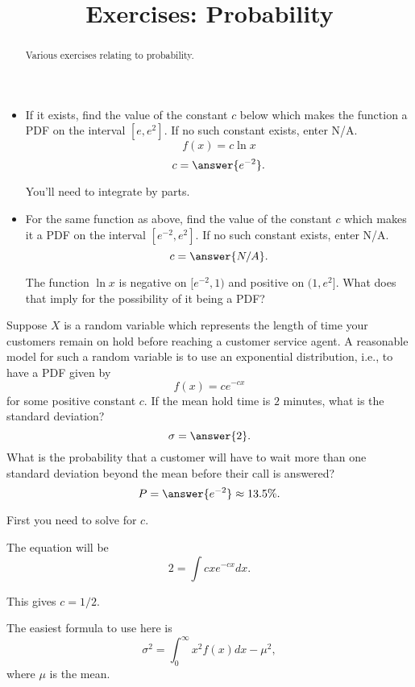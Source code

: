 \documentclass{ximera}
\title{Exercises: Probability}
\begin{document}
\begin{abstract}
Various exercises relating to probability.
\end{abstract}
\maketitle

\begin{exercise}
\begin{itemize}
\item If it exists, find the value of the constant $c$ below which makes the function a PDF on the interval $[e,e^2]$. If no such constant exists, enter N/A.
\[ f(x) = c \ln x \]
\[ c = \answer{e^{-2}}. \]
\begin{hint}
You'll need to integrate by parts.
\end{hint}
\item For the same function as above, find the value of the constant $c$ which makes it a PDF on the interval $[e^{-2},e^2]$. If no such constant exists, enter N/A.
\[ c = \answer{N/A}. \]
\begin{hint}
The function $\ln x$ is negative on $[e^{-2},1)$ and positive on $(1,e^2]$. What does that imply for the possibility of it being a PDF?
\end{hint}
\end{itemize}
\end{exercise}


\begin{exercise}
Suppose $X$ is a random variable which represents the length of time your customers remain on hold before reaching a customer service agent. A reasonable model for such a random variable is to use an exponential distribution, i.e., to have a PDF given by
\[ f(x) = c e^{-cx} \]
for some positive constant $c$.  If the mean hold time is $2$ minutes, what is the standard deviation?
\[ \sigma = \answer{2}. \]
What is the probability that a customer will have to wait more than one standard deviation beyond the mean before their call is answered?
\[ P = \answer{e^{-2}} \approx 13.5\%. \]
\begin{hint}
First you need to solve for $c$.
\begin{hint}
The equation will be \[ 2 = \int c x e^{-cx} dx. \]
\begin{hint}
This gives $c = 1/2$.
\begin{hint}
The easiest formula to use here is
\[ \sigma^2 = \int_0^\infty x^2 f(x) dx - \mu^2, \]
where $\mu$ is the mean.
\end{hint}
\end{hint}
\end{hint}
\end{hint}
\end{exercise}
\end{document}
